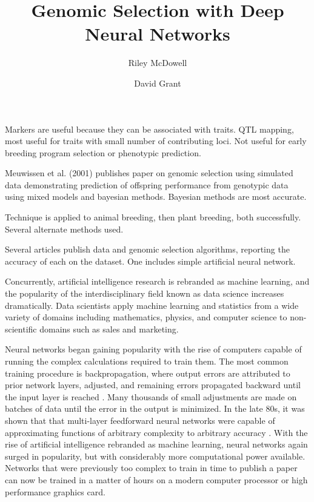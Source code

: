 \documentclass[9pt,twocolumn,twoside]{g3_article/gsag3jnl}
\title{Genomic Selection with Deep Neural Networks}
\author[$\ast$,1]{Riley McDowell}
\author[$\dagger$]{David Grant}
\affil[$\ast$]{Iowa State University, US}
\affil[$\dagger$]{Iowa State University, US}
\begin{document}
\maketitle
\thispagestyle{firststyle}
\logomark
\articletypemark
\marginmark
\firstpagefootnote
{}
\vspace{-11pt}%

\noindent %

Markers are useful because they can be associated with traits.
QTL mapping, most useful for traits with small number of contributing loci.
Not useful for early breeding program selection or phenotypic prediction.

Meuwissen et al. (2001) publishes paper on genomic selection using
simulated data demonstrating prediction of offspring performance
from genotypic data using mixed models and bayesian methods.
Bayesian methods are most accurate.

Technique is applied to animal breeding, then plant breeding,
both successfully. Several alternate methods used. 

Several articles publish data and genomic selection algorithms,
reporting the accuracy of each on the dataset. One includes 
simple artificial neural network.

Concurrently, artificial intelligence research is rebranded as machine
learning, and the popularity of the interdisciplinary field known as data science 
increases dramatically. Data scientists apply machine learning and statistics 
from a wide variety of domains including mathematics, physics, and 
computer science to non-scientific domains such as sales and marketing.

Neural networks began gaining popularity with the rise of computers capable of
running the complex calculations required to train them. The most
common training procedure is backpropagation, where output errors are attributed
to prior network layers, adjusted, and remaining errors propagated backward
until the input layer is reached \citep{rumelhart1986}. Many thousands of small 
adjustments are made on batches of data until the error in the output is 
minimized. In the late 80s, it was shown that that multi-layer feedforward 
neural networks were capable of approximating functions of arbitrary complexity to 
arbitrary accuracy \citep{hornik1989}. With the rise of artificial intelligence
rebranded as machine learning, neural networks again surged in popularity,
but with considerably more computational power available. Networks that were
previously too complex to train in time to publish a paper can now be trained in
a matter of hours on a modern computer processor or high performance graphics card. 
\end{document}
